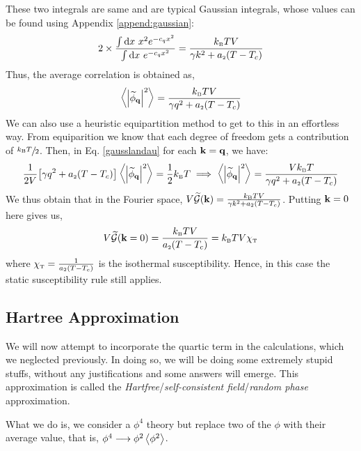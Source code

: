 These two integrals are same and are typical Gaussian integrals, whose values can be found using Appendix \ref{append:gaussian}:
\begin{align*}
    2\times \frac{\int \dd x \ x^2 e^{-c_q x^2}}{\int \dd x \ e^{-c_q x^2}} = \frac{k_{\text{\tiny B}} TV}{\gamma k^2+a_{\text{\tiny 2}}(T-T_c)}
\end{align*}
Thus, the average correlation is obtained as, 
\begin{equation}
    \left\langle \abs{\widetilde{\phi}_{\vb{q}}}^2 \right\rangle =  \frac{k_{\text{\tiny B}} TV}{\gamma q^2+a_{\text{\tiny 2}}(T-T_c)}
\end{equation}
We can also use a heuristic equipartition method to get to this in an effortless way. From equiparition we know that each degree of freedom gets a contribution of $\sfrac{k_{\text{\tiny B}} T}{2}$. Then, in Eq. \eqref{gausslandau} for each $\vb{k} = \vb{q}$, we have: 
$$\frac{1}{2V}\qty[\gamma q^2 + a_{\text{\tiny 2}}(T-T_c)]\expval{\abs{\widetilde{\phi}_{\vb{q}}}^2} = \frac{1}{2}k_{\text{\tiny B}} T \implies \expval{\abs{\widetilde{\phi}_{\vb{q}}}^2} = \frac{Vk_{\text{\tiny B}} T}{\gamma q^2 + a_{\text{\tiny 2}}(T-T_c)}$$
We thus obtain that in the Fourier space, $V\widetilde{\mathcal G}({\vb{k}}) =  \frac{k_{\text{\tiny B}} TV}{\gamma k^2+a_{\text{\tiny 2}}(T-T_c)}$. Putting $\vb{k} =0$ here gives us,
$$V\widetilde{\mathcal G}({\vb{k}=0}) =   \frac{k_{\text{\tiny B}} TV}{a_{\text{\tiny 2}}(T-T_c)} = k_{\text{\tiny B}} T V \chi_{\text{\tiny T}}$$
where $\chi_{\text{\tiny T}} = \frac{1}{a_{\text{\tiny 2}}(T-T_c)}$ is the isothermal susceptibility. Hence, in this case the static susceptibility rule still applies. 
\subsection{Hartree Approximation}
We will now attempt to incorporate the quartic term in the calculations, which we neglected previously. In doing so, we will be doing some extremely stupid stuffs, without any justifications and some answers will emerge. This approximation is called the \textit{Hartfree}/\textit{self-consistent field}/\textit{random phase} approximation.

What we do is, we consider a $\phi^4$ theory but replace two of the $\phi$ with their average value, that is, $\phi^4 \longrightarrow \phi^2 \left\langle \phi^2 \right\rangle$.


